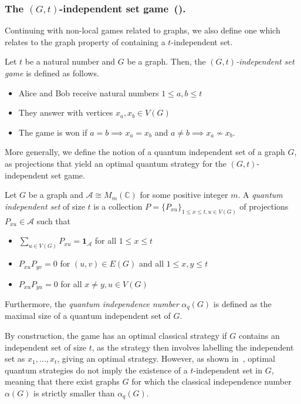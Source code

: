 \subsubsection{The $(G, t)$-independent set game~(\cite{Man_inska_2023}).}\label{def:quindep}
Continuing with non-local games related to graphs, we also define one which relates
to the graph property of containing a $t$-independent set.
\begin{definition}
    Let $t$ be a natural number and $G$ be a graph. Then, the \emph{$(G, t)$-independent set game}
    is defined as follows.
    \begin{itemize}
        \item Alice and Bob receive natural numbers $1 \leq a, b \leq t$
        \item They answer with vertices $x_a, x_b \in V(G)$
        \item The game is won if $a = b \implies x_a = x_b$ and $a \neq b \implies x_a \not\sim x_b$.
    \end{itemize}
\end{definition}
%
More generally, we define the notion of a quantum independent set of a graph $G$, as projections 
that yield an optimal quantum strategy for the $(G, t)$-independent set game.
\begin{definition}
    Let $G$ be a graph and $\mathcal{A} \cong M_m(\mathbb{C})$ for some positive integer $m$.
    A \emph{quantum independent set} of size $t$ is a collection
    $P = \{ P_{xu} \}_{1 \leq x \leq t, u \in V(G)}$ of projections
    $P_{xu} \in \mathcal{A}$ such that
    \begin{itemize}
        \item $\sum_{u \in V(G)} P_{xu} = \mathbf{1}_{\mathcal{A}}$ for all $1 \leq x \leq t$
        \item $P_{xu} P_{yv} = 0$ for $(u, v) \in E(G)$ and all $1 \leq x,y \leq t$
        \item $P_{xu} P_{yu} = 0$ for all $x \neq y, u \in V(G)$
    \end{itemize}
    Furthermore, the \emph{quantum independence number} $\alpha_q(G)$ is defined as the maximal
    size of a quantum independent set of $G$.
\end{definition}
By construction, the game has an optimal classical strategy if $G$ contains an independent set of size $t$,
as the strategy then involves labelling the independent set as $x_1, \dots, x_t$, giving an optimal strategy.
However, as shown in~\cite{Man_inska_2023}, optimal quantum strategies do not imply
the existence of a $t$-independent set in $G$, meaning that there exist graphs $G$ for which
the classical independence number $\alpha(G)$ is strictly smaller than $\alpha_q(G)$.




